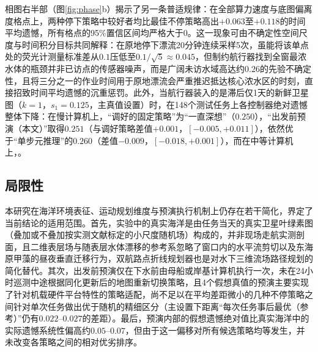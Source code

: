 相图右半部（图\ref{fig:phase}b）揭示了另一条普适规律：在全部算力速度与底图偏离度格点上，两种停下策略中较好者均比最佳不停策略高出$+0.063$至$+0.118$的时间平均遗憾，所有格点的95\%置信区间均严格大于0。这一现象可由不确定性空间尺度与时间积分目标共同解释：在原地停下漂流20分钟连续采样5次，虽能将该单点处的荧光计测量标准差从$0.1$压低至$0.1/\sqrt{5}\approx 0.045$，但制约航行器找到全窗最浓水体的瓶颈并非已访点的传感器噪声，而是广阔未访水域高达约$0.26$的先验不确定性，且将三分之一的作业时间用于原地漂流会严重推迟抵达核心浓水区的时刻，直接招致时间平均遗憾的沉重惩罚。此外，当航行器装入的是滞后仅1天的新鲜卫星图（$k=1$，$s_1=0.125$，主真值设置）时，在148个测试任务上各控制器绝对遗憾整体下降：在慢计算机上，“调好的固定策略”为“一直深想”（$0.250$），“出发前预演（本文）”取得$0.251$（与调好策略差值$+0.001$，$[-0.005, +0.011]$），依然优于“单步元推理”的$0.260$（差值$-0.009$，$[-0.018, +0.001]$），而在中等计算机上，。

\subsection{局限性}

本研究在海洋环境表征、运动规划维度与预演执行机制上仍存在若干简化，界定了当前结论的适用范围。首先，实验中的真实海洋是由任务当天的真实卫星叶绿素图（叠加或不叠加按实测文献标定的小尺度随机场）构成的，并非现场走航实测剖面，且二维表层场与随表层水体漂移的参考系忽略了窗口内的水平流剪切以及东海原甲藻的昼夜垂直迁移行为，双航路点折线规划器也是对水下三维流场路径规划的简化替代。其次，出发前预演仅在下水前由母船或岸基计算机执行一次，未在24小时巡测中途根据同化更新后的地图重新切换策略，且4个假想真值的预演主要实现了针对机载硬件平台特性的策略适配，尚不足以在平均差距微小的几种不停策略之间针对单次任务做出优于随机的精细区分（主设置下距离“每次任务事后最优（参考）”仍有$0.022\text{--}0.027$的差距）。最后，预演内部的假想遗憾绝对值比真实海洋中的实际遗憾系统性偏高约$0.05\text{--}0.07$，但由于这一偏移对所有候选策略均等发生，并未改变各策略之间的相对优劣排序。

